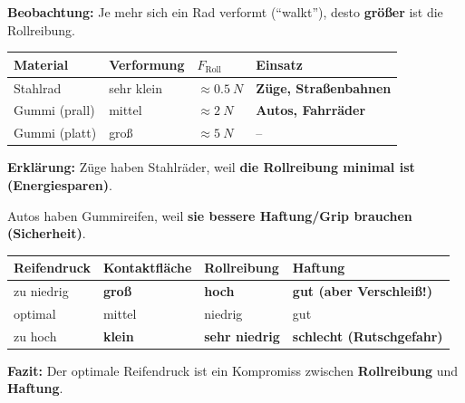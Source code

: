 \documentclass[11pt,a4paper]{article}
\newcommand{\lsg}[1]{\textcolor{loesung}{\textbf{#1}}}
\begin{document}
\begin{protokollbox}[title=B1: Rollreibung -- Warum Stahlräder bei Zügen?]
\small
\textbf{Beobachtung:} Je mehr sich ein Rad verformt (``walkt''), desto \lsg{größer} ist die Rollreibung.

\vspace{0.3em}
\renewcommand{\arraystretch}{1.3}
\begin{tabular}{|p{3cm}|p{2.5cm}|p{2.5cm}|p{4cm}|}
\hline
\textbf{Material} & \textbf{Verformung} & \textbf{$F_{\text{Roll}}$} & \textbf{Einsatz} \\
\hline
Stahlrad & sehr klein & $\approx \SI{0,5}{N}$ & \lsg{Züge, Straßenbahnen} \\
\hline
Gummi (prall) & mittel & $\approx \SI{2}{N}$ & \lsg{Autos, Fahrräder} \\
\hline
Gummi (platt) & groß & $\approx \SI{5}{N}$ & -- \\
\hline
\end{tabular}

\vspace{0.3em}
\textbf{Erklärung:} Züge haben Stahlräder, weil \lsg{die Rollreibung minimal ist (Energiesparen)}.

Autos haben Gummireifen, weil \lsg{sie bessere Haftung/Grip brauchen (Sicherheit)}.
\end{protokollbox}

\vspace{0.3em}

\begin{protokollbox}[title=B2: Reifendruck und Haftung]
\small
\renewcommand{\arraystretch}{1.3}
\begin{tabular}{|p{3cm}|p{2.5cm}|p{2.5cm}|p{3.5cm}|}
\hline
\textbf{Reifendruck} & \textbf{Kontaktfläche} & \textbf{Rollreibung} & \textbf{Haftung} \\
\hline
zu niedrig & \lsg{groß} & \lsg{hoch} & \lsg{gut (aber Verschleiß!)} \\
\hline
optimal & mittel & niedrig & gut \\
\hline
zu hoch & \lsg{klein} & \lsg{sehr niedrig} & \lsg{schlecht (Rutschgefahr)} \\
\hline
\end{tabular}

\vspace{0.3em}
\textbf{Fazit:} Der optimale Reifendruck ist ein Kompromiss zwischen \lsg{Rollreibung} und \lsg{Haftung}.
\end{protokollbox}
\end{document}
